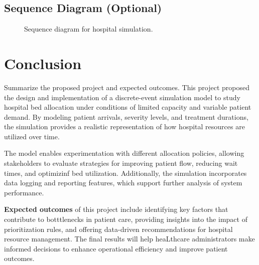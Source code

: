 \documentclass[12pt]{article}
\begin{document}
\subsection{Sequence Diagram (Optional)}

\begin{figure}[H]
\centering
{}
\caption{Sequence diagram for hospital simulation.}
\end{figure}

\section{Conclusion}
Summarize the proposed project and expected outcomes.
This project proposed the design and implementation of a discrete-event simulation model to study hospital bed allocation under conditions of limited capacity and variable patient demand. By modeling patient arrivals, severity levels, and treatment durations, the simulation provides a realistic representation of how hospital resources are utilized over time. 

The model enables experimentation with different allocation policies, allowing stakeholders to evaluate strategies for improving patient flow, reducing wait times, and optimizinf bed utilization. Additionally, the simulation incorporates data logging and reporting features, which support further analysis of system performance.

\textbf{Expected outcomes} of this project include identifying key factors that contribute to botttlenecks in patient care, providing insights into the impact of prioritization rules, and offering data-driven recommendations for hospital resource management. The final results will help heaLthcare administrators make informed decisions to enhance operational efficiency and improve patient outcomes. 


\newpage

%

\end{document}
